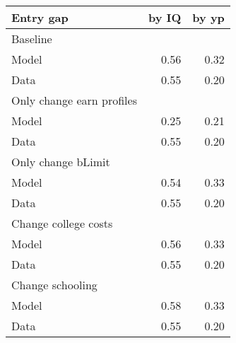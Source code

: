 \begin{tabular}{lrr}
\hline
Entry gap & by IQ  & by yp  \\ 
\hline
Baseline &   &   \\ 
Model & 0.56  & 0.32  \\ 
Data & 0.55  & 0.20  \\ 
Only change earn profiles &   &   \\ 
Model & 0.25  & 0.21  \\ 
Data & 0.55  & 0.20  \\ 
Only change bLimit &   &   \\ 
Model & 0.54  & 0.33  \\ 
Data & 0.55  & 0.20  \\ 
Change college costs &   &   \\ 
Model & 0.56  & 0.33  \\ 
Data & 0.55  & 0.20  \\ 
Change schooling &   &   \\ 
Model & 0.58  & 0.33  \\ 
Data & 0.55  & 0.20  \\ 
\hline
\end{tabular}%
